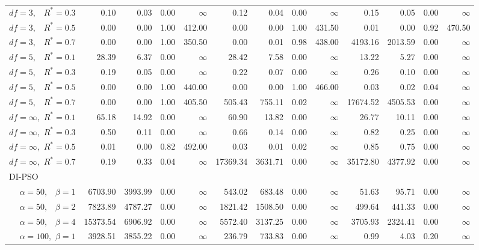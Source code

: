 \documentclass[cmbright]{staauth}
\begin{document}
\begin{table}[ht]
{\begin{tabular}{r|rrrr|rrrr|rrrr}
  $df = 3,\enspace$ $R^* =0.3$ & 0.10 & 0.03 & 0.00 & $\infty$ & 0.12 & 0.04 & 0.00 & $\infty$ & 0.15 & 0.05 & 0.00 & $\infty$ \\
  $df = 3,\enspace$ $R^* =0.5$ & 0.00 & 0.00 & 1.00 & 412.00 & 0.00 & 0.00 & 1.00 & 431.50 & 0.01 & 0.00 & 0.92 & 470.50 \\
  $df = 3,\enspace$ $R^* =0.7$ & 0.00 & 0.00 & 1.00 & 350.50 & 0.00 & 0.01 & 0.98 & 438.00 & 4193.16 & 2013.59 & 0.00 & $\infty$ \\
  $df = 5,\enspace$ $R^* =0.1$ & 28.39 & 6.37 & 0.00 & $\infty$ & 28.42 & 7.58 & 0.00 & $\infty$ & 13.22 & 5.27 & 0.00 & $\infty$ \\
  $df = 5,\enspace$ $R^* =0.3$ & 0.19 & 0.05 & 0.00 & $\infty$ & 0.22 & 0.07 & 0.00 & $\infty$ & 0.26 & 0.10 & 0.00 & $\infty$ \\
  $df = 5,\enspace$ $R^* =0.5$ & 0.00 & 0.00 & 1.00 & 440.00 & 0.00 & 0.00 & 1.00 & 466.00 & 0.03 & 0.02 & 0.04 & $\infty$ \\
  $df = 5,\enspace$ $R^* =0.7$ & 0.00 & 0.00 & 1.00 & 405.50 & 505.43 & 755.11 & 0.02 & $\infty$ & 17674.52 & 4505.53 & 0.00 & $\infty$ \\
  $df = \infty,$ $R^* =0.1$ & 65.18 & 14.92 & 0.00 & $\infty$ & 60.90 & 13.82 & 0.00 & $\infty$ & 26.77 & 10.11 & 0.00 & $\infty$ \\
  $df = \infty,$ $R^* =0.3$ & 0.50 & 0.11 & 0.00 & $\infty$ & 0.66 & 0.14 & 0.00 & $\infty$ & 0.82 & 0.25 & 0.00 & $\infty$ \\
  $df = \infty,$ $R^* =0.5$ & 0.01 & 0.00 & 0.82 & 492.00 & 0.03 & 0.01 & 0.02 & $\infty$ & 0.85 & 0.75 & 0.00 & $\infty$ \\
  $df = \infty,$ $R^* =0.7$ & 0.19 & 0.33 & 0.04 & $\infty$ & 17369.34 & 3631.71 & 0.00 & $\infty$ & 35172.80 & 4377.92 & 0.00 & $\infty$ \\
\hline
\multicolumn{1}{l|}{DI-PSO} &&&&&&&&&&&&\\
  $\alpha = 50,\enspace$ $\beta =1$ & 6703.90 & 3993.99 & 0.00 & $\infty$ & 543.02 & 683.48 & 0.00 & $\infty$ & 51.63 & 95.71 & 0.00 & $\infty$ \\
  $\alpha = 50,\enspace$ $\beta =2$ & 7823.89 & 4787.27 & 0.00 & $\infty$ & 1821.42 & 1508.50 & 0.00 & $\infty$ & 499.64 & 441.33 & 0.00 & $\infty$ \\
  $\alpha = 50,\enspace$ $\beta =4$ & 15373.54 & 6906.92 & 0.00 & $\infty$ & 5572.40 & 3137.25 & 0.00 & $\infty$ & 3705.93 & 2324.41 & 0.00 & $\infty$ \\
  $\alpha = 100,$ $\beta =1$ & 3928.51 & 3855.22 & 0.00 & $\infty$ & 236.79 & 733.83 & 0.00 & $\infty$ & 0.99 & 4.03 & 0.20 & $\infty$ \\

\end{tabular}}
\end{table}
\end{document}
